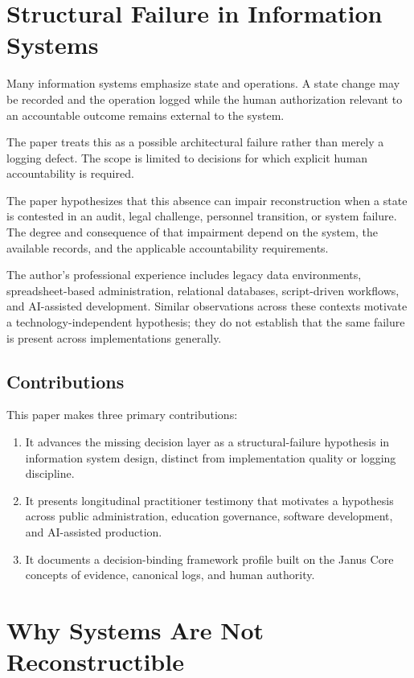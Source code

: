 \documentclass[conference]{IEEEtran}
\begin{document}
\section{Structural Failure in Information Systems}

Many information systems emphasize state and operations. A state change may be
recorded and the operation logged while the human authorization relevant to an
accountable outcome remains external to the system.

The paper treats this as a possible architectural failure rather than merely a
logging defect. The scope is limited to decisions for which explicit human
accountability is required.

The paper hypothesizes that this absence can impair reconstruction when a state
is contested in an audit, legal challenge, personnel transition, or system
failure. The degree and consequence of that impairment depend on the system,
the available records, and the applicable accountability requirements.

The author's professional experience includes legacy data environments,
spreadsheet-based administration, relational databases, script-driven
workflows, and AI-assisted development. Similar observations across these
contexts motivate a technology-independent hypothesis; they do not establish
that the same failure is present across implementations generally.

\subsection{Contributions}

This paper makes three primary contributions:

\begin{enumerate}
  \item It advances the missing decision layer as a structural-failure
  hypothesis in information system design, distinct from implementation quality
  or logging discipline.
  \item It presents longitudinal practitioner testimony that motivates a
  hypothesis across public administration, education governance, software
  development, and AI-assisted production.
  \item It documents a decision-binding framework profile built on the Janus
  Core concepts of evidence, canonical logs, and human authority.
\end{enumerate}

\section{Why Systems Are Not Reconstructible}
\end{document}
